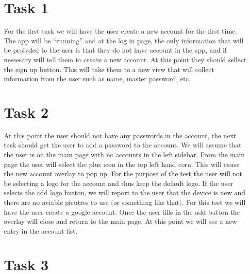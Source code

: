 \documentclass[a4paper,12pt]{article}
\begin{document}
\section*{Task 1}

For the first task we will have the user create a new account for the first time. The app will be ``running'' and
at the log in page, the only information that will be proivded to the user is that they do not have account in the
app, and if nessesary will tell them to create a new account. At this point they should sellect the sign up button.
This will take them to a new view that will collect information from the user such as name, master password, etc.


\section*{Task 2}
At this point the user should not have any passwords in the account, the next task should get the user to add
a password to the account. We will assume that the user is on the main page with no accounts in the left
sidebar. From the main page the user will select the plus icon in the top left hand corn. This will cause
the new account overlay to pop up. For the purpose of the test the user will not be selecting a logo for
the account and thus keep the default logo. If the user selects the add logo button, we will report to
the user that the device is new and there are no aviable picutres to use $($or something like that$)$.
For this test we will have the user create a google account. Once the user fills in the add button
the overlay will close and return to the main page. At this point we will see a new entry in the
account list.

\section*{Task 3}
\end{document}
